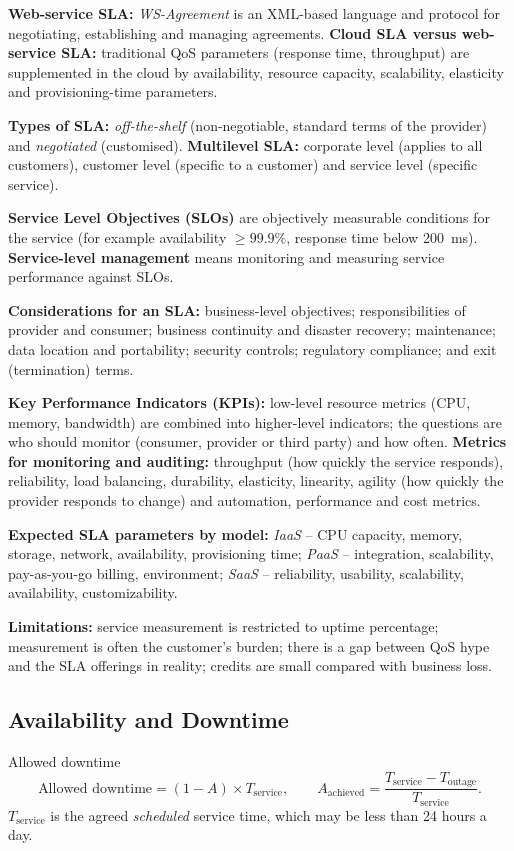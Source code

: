\documentclass[11pt,a4paper,openany]{report}
\begin{document}
\textbf{Web-service SLA:} \emph{WS-Agreement} is an XML-based language and protocol for negotiating, establishing and
managing agreements. \textbf{Cloud SLA versus web-service SLA:} traditional QoS parameters (response time,
throughput) are supplemented in the cloud by availability, resource capacity, scalability, elasticity and
provisioning-time parameters.

\textbf{Types of SLA:} \emph{off-the-shelf} (non-negotiable, standard terms of the provider) and \emph{negotiated}
(customised). \textbf{Multilevel SLA:} corporate level (applies to all customers), customer level (specific to a
customer) and service level (specific service).

\textbf{Service Level Objectives (SLOs)} are objectively measurable conditions for the service (for example
availability $\ge 99.9\%$, response time below 200~ms). \textbf{Service-level management} means monitoring and measuring
service performance against SLOs.

\textbf{Considerations for an SLA:} business-level objectives; responsibilities of provider and consumer;
business continuity and disaster recovery; maintenance; data location and portability; security controls;
regulatory compliance; and exit (termination) terms.

\textbf{Key Performance Indicators (KPIs):} low-level resource metrics (CPU, memory, bandwidth) are combined into
higher-level indicators; the questions are who should monitor (consumer, provider or third party) and how often.
\textbf{Metrics for monitoring and auditing:} throughput (how quickly the service responds), reliability, load balancing,
durability, elasticity, linearity, agility (how quickly the provider responds to change) and automation, performance
and cost metrics.

\textbf{Expected SLA parameters by model:} \emph{IaaS} -- CPU capacity, memory, storage, network, availability,
provisioning time; \emph{PaaS} -- integration, scalability, pay-as-you-go billing, environment; \emph{SaaS} --
reliability, usability, scalability, availability, customizability.

\textbf{Limitations:} service measurement is restricted to uptime percentage; measurement is often the customer's
burden; there is a gap between QoS hype and the SLA offerings in reality; credits are small compared with business
loss.

\subsection{Availability and Downtime}
\begin{thmbox}{Allowed downtime}
\[ \text{Allowed downtime} = (1 - A)\times T_{\text{service}}, \qquad
   A_{\text{achieved}} = \frac{T_{\text{service}} - T_{\text{outage}}}{T_{\text{service}}}. \]
$T_{\text{service}}$ is the agreed \emph{scheduled} service time, which may be less than 24 hours a day.
\end{thmbox}
\end{document}

